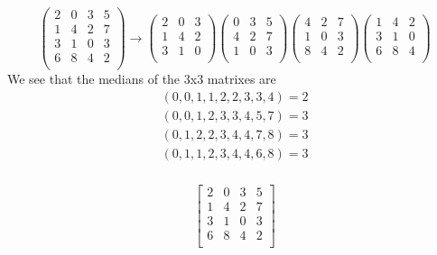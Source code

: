 \documentclass[11pt,fleqn]{article}
\begin{document}
\[ \left( \begin{array}{cccc}
2 & 0 & 3 & 5 \\
1 & 4 & 2 & 7 \\
3 & 1 & 0 & 3 \\
6 & 8 & 4 & 2 \\ 
\end{array} \right)
\rightarrow
\left(\begin{array}{ccc}
2 & 0 & 3 \\
1 & 4 & 2 \\
3 & 1 & 0 \\
\end{array} \right)
\left(\begin{array}{ccc}
0 & 3 & 5 \\
4 & 2 & 7 \\
1 & 0 & 3 \\
\end{array} \right)
\left(\begin{array}{ccc}
4 & 2 & 7 \\
1 & 0 & 3 \\
8 & 4 & 2 \\
\end{array} \right)
\left(\begin{array}{ccc}
1 & 4 & 2 \\
3 & 1 & 0 \\
6 & 8 & 4 \\
\end{array} \right)\]
We see that the medians of the 3x3 matrixes are
\begin{equation} \label{eq1}
\begin{split}
(0,0,1,1,2,2,3,3,4) = 2\\
(0,0,1,2,3,3,4,5,7) = 3\\
(0,1,2,2,3,4,4,7,8) = 3\\
(0,1,1,2,3,4,4,6,8) = 3\\
\end{split}
\end{equation}


\begin{equation}
\begin{aligned}
\begin{bmatrix}
2 & 0 & 3 & 5 \\
1 & 4 & 2 & 7 \\
3 & 1 & 0 & 3 \\
6 & 8 & 4 & 2 \\ 
\end{bmatrix}
\end{aligned}
\end{equation}
\end{document}
